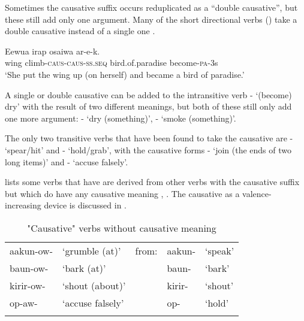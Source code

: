Sometimes the causative suffix occurs reduplicated as a ``double causative'', but these still add only one argument. Many of the short directional verbs () take a double causative instead of a single one . 

\ea%
\label{ex:3:x205}
\gll Eewua irap osaiwa ar-e-k. \\
wing climb-\textsc{caus}-\textsc{caus}-\textsc{ss}.\textsc{seq} bird.of.paradise become-\textsc{pa}-3s \\
\glt`She put the wing up (on herself) and became a bird of paradise.'
\z

A single or double causative can be added to the intransitive verb - `(become) dry' with the result of two different meanings, but both of these still only add one more argument: - `dry (something)', - `smoke (something)'.

The only two transitive verbs that have been found to take the causative are - `spear/hit' and - `hold/grab', with the causative forms - `join (the ends of two long items)' and - `accuse falsely'. 

 lists some verbs that have are derived from other verbs with the causative suffix but which do  have any causative meaning , . The causative as a valence-increasing device is discussed in . 

\begin{table}
\caption{"Causative" verbs without causative meaning}
\label{tab:3:pseudocausatives}
 
\begin{tabular}{lllll}
\mytoprule
aakun-ow- &`grumble (at)' &from: &aakun- &`speak'\\
baun-ow- &`bark (at)' & &baun- &`bark'\\
kirir-ow- &`shout (about)' & &kirir- &`shout'\\
op-aw- &`accuse falsely' & &op- &`hold'\\
\mybottomrule
\end{tabular} 

\end{table}

